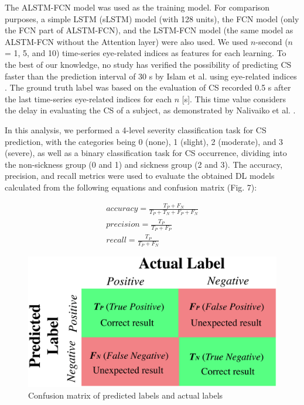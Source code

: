 \documentclass{ieeeaccess}
\begin{document}
The ALSTM-FCN model was used as the training model. For comparison purposes, a simple LSTM (sLSTM) model (with 128 units), the FCN model (only the FCN part of ALSTM-FCN), and the LSTM-FCN model (the same model as ALSTM-FCN without the Attention layer) were also used. We used $n$-second ($n$ = 1, 5, and 10) time-series eye-related indices as features for each learning. 
To the best of our knowledge, no study has verified the possibility of predicting CS faster than the prediction interval of 30 s by Islam et al. using eye-related indices \cite{Islam_2021}. The ground truth label was based on the evaluation of CS recorded 0.5 s after the last time-series eye-related indices for each $n$ [s]. This time value considers the delay in evaluating the CS of a subject, as demonstrated by Nalivaiko et al. \cite{Nalivaiko_2015}.

In this analysis, we performed a 4-level severity classification task for CS prediction, with the categories being 0 (none), 1 (slight), 2 (moderate), and 3 (severe), as well as a binary classification task for CS occurrence, dividing into the non-sickness group (0 and 1) and sickness group (2 and 3). The accuracy, precision, and recall metrics were used to evaluate the obtained DL models calculated from the following equations and confusion matrix (Fig. 7):


\begin{align}
    accuracy = \frac{T_P + F_N}{T_P + T_N + F_P + F_N} \\
    precision = \frac{T_P}{T_P + F_P} \\
    recall = \frac{T_P}{T_P + F_N}
\end{align}

\begin{figure}[th]
  \begin{center}
    \includegraphics*[width=0.7\linewidth]{Precision_Recall.png}
  \end{center}
  \caption{Confusion matrix of predicted labels and actual labels}
  \label{figure}
\end{figure}
\end{document}
